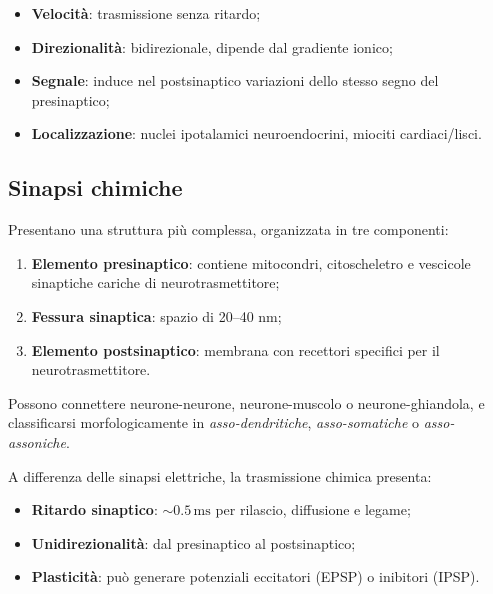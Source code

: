 \documentclass[11pt,a4paper,italian,twoside]{report}
\theoremstyle{definition} %
\begin{document}
\begin{itemize}
  \item \textbf{Velocità}: trasmissione senza ritardo;
  \item \textbf{Direzionalità}: bidirezionale, dipende dal gradiente ionico;
  \item \textbf{Segnale}: induce nel postsinaptico variazioni dello stesso segno del presinaptico;
  \item \textbf{Localizzazione}: nuclei ipotalamici neuroendocrini, miociti cardiaci/lisci.
\end{itemize}

\subsection{Sinapsi chimiche}
\label{subsec:sinapsi_chimiche}

Presentano una struttura più complessa, organizzata in tre componenti:
\begin{enumerate}
  \item \textbf{Elemento presinaptico}: contiene mitocondri, citoscheletro e vescicole sinaptiche cariche di neurotrasmettitore;
  \item \textbf{Fessura sinaptica}: spazio di 20–40 nm;
  \item \textbf{Elemento postsinaptico}: membrana con recettori specifici per il neurotrasmettitore.
\end{enumerate}

Possono connettere neurone-neurone, neurone-muscolo o neurone-ghiandola, e classificarsi morfologicamente in \textit{asso-dendritiche}, \textit{asso-somatiche} o \textit{asso-assoniche}.

\begin{concetto}
A differenza delle sinapsi elettriche, la trasmissione chimica presenta:
\begin{itemize}[leftmargin=1.2em,noitemsep,topsep=0pt,partopsep=0pt]
  \item \textbf{Ritardo sinaptico}: $\sim 0.5\,\mathrm{ms}$ per rilascio, diffusione e legame;
  \item \textbf{Unidirezionalità}: dal presinaptico al postsinaptico;
  \item \textbf{Plasticità}: può generare potenziali eccitatori (EPSP) o inibitori (IPSP).
\end{itemize}
\end{concetto}

\end{document}

